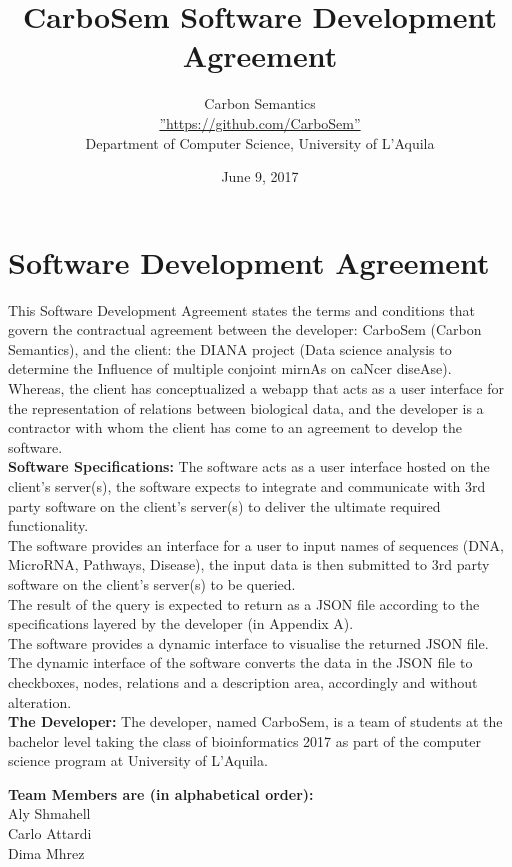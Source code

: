 \documentclass[12pt]{report}
\title{CarboSem Software Development Agreement}
\date{June 9, 2017}
\author{Carbon Semantics\\\hyperref[https://github.com/CarboSem]{''https://github.com/CarboSem''}\\ Department of Computer Science, University of L'Aquila}
\begin{document}
\section{Software Development Agreement}
This Software Development Agreement states the terms and conditions that govern the contractual agreement between the developer: CarboSem (Carbon Semantics), and the client: the DIANA project (Data science analysis to determine the Influence of multiple conjoint mirnAs on caNcer diseAse).\\

Whereas, the client has conceptualized a webapp that acts as a user interface for the representation of relations between biological data, and the developer is a contractor with whom the client has come to an agreement to develop the software.\\

\textbf{Software Specifications:}
The software acts as a user interface hosted on the client's server(s), the software expects to integrate and communicate with 3rd party software on the client's server(s) to deliver the ultimate required functionality.\\

The software provides an interface for a user to input names of sequences (DNA, MicroRNA, Pathways, Disease), the input data is then submitted to 3rd party software on the client's server(s) to be queried.\\

The result of the query is expected to return as a JSON file according to the specifications layered by the developer (in Appendix A).\\

The software provides a dynamic interface to visualise the returned JSON file.
The dynamic interface of the software converts the data in the JSON file to checkboxes, nodes, relations and a description area, accordingly and without alteration.\\

\textbf{The Developer:}
The developer, named CarboSem, is a team of students at the bachelor level taking the class of bioinformatics 2017 as part of the computer science program at University of L'Aquila.\\

\begin{center}
	\textbf{Team Members are (in alphabetical order):}\\ Aly Shmahell\\ Carlo Attardi\\ Dima Mhrez\\
\end{center}
\end{document}

